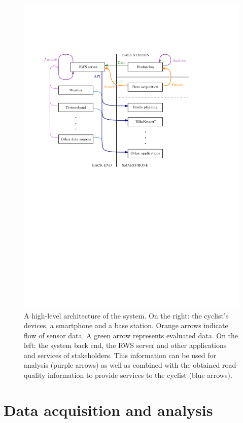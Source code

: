 \documentclass[a4paper,11pt]{article}
\begin{document}
\begin{figure}
\centering
\includegraphics{figures/systemoverview}
\caption{A high-level architecture of the system. On the right: the cyclist's devices, a smartphone and a base station. Orange arrows indicate flow of sensor data. A green arrow represents evaluated data. On the left: the system back end, the RWS server and other applications and services of stakeholders. This information can be used for analysis (purple arrows) as well as combined with the obtained road-quality information to provide services to the cyclist (blue arrows).}
\label{fig:architecture}
\end{figure}

\section{Data acquisition and analysis}
\end{document}

